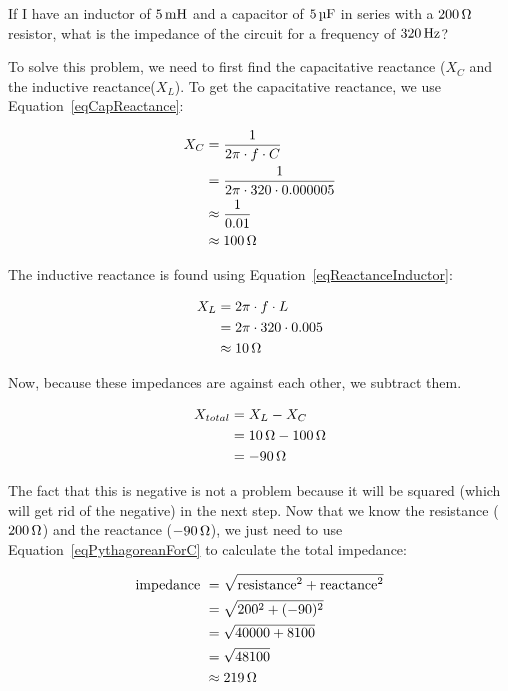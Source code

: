\begin{exampleprob}
If I have an inductor of $5\mymhy$ and a capacitor of $5\,\si{\micro\farad}$ in series with a $200\,\si{\ohm}$ resistor, what is the impedance of the circuit for a frequency of $320\,\si{\hertz}$?

To solve this problem, we need to first find the capacitative reactance ($X_C$ and the inductive reactance($X_L$).
To get the capacitative reactance, we use Equation~\ref{eqCapReactance}:

\begin{align*}
X_C &= \frac{1}{2\pi\cdot f\cdot C} \\
    &= \frac{1}{2\pi\cdot 320\cdot 0.000005} \\
    &\approx \frac{1}{0.01} \\
    &\approx 100\,\si{\ohm}
\end{align*}

The inductive reactance is found using Equation~\ref{eqReactanceInductor}:

\begin{align*}
X_L &= 2\pi\cdot f\cdot L \\
    &= 2\pi\cdot 320 \cdot 0.005 \\
    &\approx 10\,\si{\ohm}
\end{align*}

Now, because these impedances are against each other, we subtract them.

\begin{align*}
X_{total} &= X_L - X_C \\
 &= 10\,\si{\ohm} - 100\,\si{\ohm} \\
 &= -90\,\si{\ohm}
\end{align*}

The fact that this is negative is not a problem because it will be squared (which will get rid of the negative) in the next step.
Now that we know the resistance ($200\,\si{\ohm}$) and the reactance ($-90\,\si{\ohm}$), we just need to use Equation~\ref{eqPythagoreanForC} to calculate the total impedance:

\begin{align*}
\textrm{impedance } &= \sqrt{\textrm{resistance}^2 + \textrm{reactance}^2} \\ 
  &= \sqrt{200^2 + (-90)^2} \\
  &= \sqrt{40000 + 8100} \\
  &= \sqrt{48100} \\
  &\approx 219\,\si{\ohm}
\end{align*}
\end{exampleprob}


